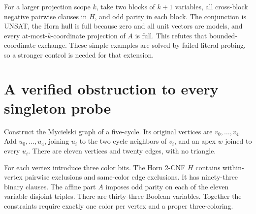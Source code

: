\documentclass[11pt]{article}
\begin{document}
For a larger projection scope \(k\), take two blocks of \(k+1\) variables,
all cross-block negative pairwise clauses in \(H\), and odd parity in
each block. The conjunction is UNSAT, the Horn hull is full because
zero and all unit vectors are models, and every at-most-\(k\)-coordinate
projection of \(A\) is full. This refutes that bounded-coordinate
exchange. These simple examples are solved by failed-literal probing,
so a stronger control is needed for that extension.

\section{A verified obstruction to every singleton probe}
Construct the Mycielski graph of a five-cycle. Its original vertices
are \(v_0,\ldots,v_4\). Add \(u_0,\ldots,u_4\), joining \(u_i\) to
the two cycle neighbors of \(v_i\), and an apex \(w\) joined to every
\(u_i\). There are eleven vertices and twenty edges, with no triangle.

For each vertex introduce three color bits. The Horn 2-CNF \(H\)
contains within-vertex pairwise exclusions and same-color edge
exclusions. It has ninety-three binary clauses.
The affine part \(A\) imposes odd parity on each of the eleven
variable-disjoint triples. There are thirty-three Boolean variables.
Together the constraints require exactly one color per vertex and a
proper three-coloring.
\end{document}
